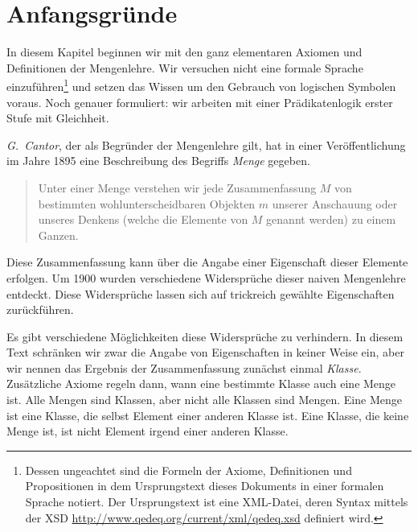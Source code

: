 \documentclass[a4paper,german,10pt,twoside]{book}
\theoremstyle{definition}
\theoremstyle{remark}
\begin{document}

\chapter{Anfangsgr{\"u}nde} \label{chapter2} \hypertarget{chapter2}{}

In diesem Kapitel beginnen wir mit den ganz elementaren Axiomen und Definitionen der Mengenlehre. Wir versuchen nicht eine formale Sprache einzuf{\"u}hren\footnote{Dessen ungeachtet sind die Formeln der Axiome, Definitionen und Propositionen in dem Ursprungstext dieses Dokuments in einer formalen Sprache notiert. Der Ursprungstext ist eine XML-Datei, deren Syntax mittels der XSD \url{http://www.qedeq.org/current/xml/qedeq.xsd} definiert wird.} und setzen das Wissen um den Gebrauch von logischen Symbolen voraus. Noch genauer formuliert: wir arbeiten mit einer Pr{\"a}dikatenlogik erster Stufe mit Gleichheit.

\par{}
\emph{G.~Cantor}, der als Begr{\"u}nder der Mengenlehre gilt, hat in einer Ver{\"o}ffentlichung im Jahre 1895 eine Beschreibung des Begriffs \emph{Menge} gegeben.

\begin{quote}
 Unter einer {\glqq Menge\grqq} verstehen wir jede Zusammenfassung $M$ von bestimmten wohlunterscheidbaren Objekten $m$ unserer Anschauung oder unseres Denkens (welche die {\glqq Elemente\grqq} von $M$ genannt werden) zu einem Ganzen.
\end{quote}

\par
Diese Zusammenfassung kann {\"u}ber die Angabe einer Eigenschaft dieser Elemente erfolgen. Um 1900 wurden verschiedene Widerspr{\"u}che dieser naiven Mengenlehre entdeckt. Diese Widerspr{\"u}che lassen sich auf trickreich gew{\"a}hlte Eigenschaften zur{\"u}ckf{\"u}hren.

\par
Es gibt verschiedene M{\"o}glichkeiten diese Widerspr{\"u}che zu verhindern. In diesem Text schr{\"a}nken wir zwar die Angabe von Eigenschaften in keiner Weise ein, aber wir nennen das Ergebnis der Zusammenfassung zun{\"a}chst einmal \emph{Klasse}. Zus{\"a}tzliche Axiome regeln dann, wann eine bestimmte Klasse auch eine Menge ist. Alle Mengen sind Klassen, aber nicht alle Klassen sind Mengen. Eine Menge ist eine Klasse, die selbst Element einer anderen Klasse ist. Eine Klasse, die keine Menge ist, ist nicht Element irgend einer anderen Klasse.
\end{document}
